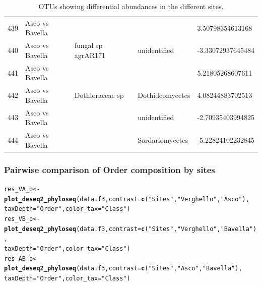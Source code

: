 \documentclass[12pt]{article}\usepackage[]{graphicx}\usepackage[]{color}
\makeatletter
\newcommand{\hlstr}[1]{\textcolor[rgb]{0.192,0.494,0.8}{#1}}%
\newcommand{\hlstd}[1]{\textcolor[rgb]{0.345,0.345,0.345}{#1}}%
\newcommand{\hlkwb}[1]{\textcolor[rgb]{0.69,0.353,0.396}{#1}}%
\newcommand{\hlkwc}[1]{\textcolor[rgb]{0.333,0.667,0.333}{#1}}%
\newcommand{\hlkwd}[1]{\textcolor[rgb]{0.737,0.353,0.396}{\textbf{#1}}}%
\newenvironment{kframe}{%
 \def\at@end@of@kframe{}%
 \ifinner\ifhmode%
  \def\at@end@of@kframe{\end{minipage}}%
  \begin{minipage}{\columnwidth}%
 \fi\fi%
 \def\FrameCommand##1{\hskip\@totalleftmargin \hskip-\fboxsep
 \colorbox{shadecolor}{##1}\hskip-\fboxsep
     \hskip-\linewidth \hskip-\@totalleftmargin \hskip\columnwidth}%
 \MakeFramed {\advance\hsize-\width
   \@totalleftmargin\z@ \linewidth\hsize
   \@setminipage}}%
 {\par\unskip\endMakeFramed%
 \at@end@of@kframe}
\newenvironment{knitrout}{}{} %
\numberwithin{figure}{section}
\makeatother
\begin{document}
\begin{table}[ht]
\begin{tabular}{lllll}
  439 & Asco vs Bavella &  &  & 3.50798354613168 \\ 
  440 & Asco vs Bavella & fungal sp agrAR171 & unidentified & -3.33072937645484 \\ 
  441 & Asco vs Bavella &  &  & 5.21805268607611 \\ 
  442 & Asco vs Bavella & Dothioraceae sp & Dothideomycetes & 4.08244883702513 \\ 
  443 & Asco vs Bavella &  & unidentified & -2.70935403994825 \\ 
  444 & Asco vs Bavella &  & Sordariomycetes & -5.22824102232845 \\ 
   \hline
\end{tabular}
\endgroup
\caption{OTUs showing differential abundances in the different sites.} 
\end{table}


    \subsubsection{Pairwise comparison of Order composition by sites}

\begin{knitrout}\small
{}\color{fgcolor}\begin{kframe}
\begin{alltt}
\hlstd{res_VA_o} \hlkwb{<-} \hlkwd{plot_deseq2_phyloseq}\hlstd{(data.f3,} \hlkwc{contrast} \hlstd{=} \hlkwd{c}\hlstd{(}\hlstr{"Sites"}\hlstd{,} \hlstr{"Verghello"}\hlstd{,} \hlstr{"Asco"}\hlstd{),}
                               \hlkwc{taxDepth} \hlstd{=} \hlstr{"Order"}\hlstd{,} \hlkwc{color_tax} \hlstd{=} \hlstr{"Class"}\hlstd{)}
\hlstd{res_VB_o} \hlkwb{<-} \hlkwd{plot_deseq2_phyloseq}\hlstd{(data.f3,} \hlkwc{contrast} \hlstd{=} \hlkwd{c}\hlstd{(}\hlstr{"Sites"}\hlstd{,} \hlstr{"Verghello"}\hlstd{,} \hlstr{"Bavella"}\hlstd{),}
                               \hlkwc{taxDepth} \hlstd{=} \hlstr{"Order"}\hlstd{,} \hlkwc{color_tax} \hlstd{=} \hlstr{"Class"}\hlstd{)}
\hlstd{res_AB_o} \hlkwb{<-} \hlkwd{plot_deseq2_phyloseq}\hlstd{(data.f3,} \hlkwc{contrast} \hlstd{=} \hlkwd{c}\hlstd{(}\hlstr{"Sites"}\hlstd{,} \hlstr{"Asco"}\hlstd{,} \hlstr{"Bavella"}\hlstd{),}
                               \hlkwc{taxDepth} \hlstd{=} \hlstr{"Order"}\hlstd{,} \hlkwc{color_tax} \hlstd{=} \hlstr{"Class"}\hlstd{)}
\end{alltt}
\end{kframe}
\end{knitrout}
\end{document}
